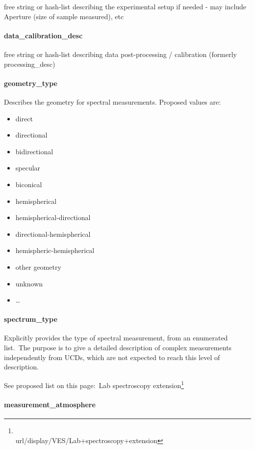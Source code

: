 \documentclass[11pt,a4paper]{ivoa}
\begin{document}
free string or hash-list describing the experimental setup if needed - may include Aperture (size of sample measured), etc

\paragraph{data\_calibration\_desc}

free string or hash-list describing data post-processing / calibration (formerly processing\_desc)

\paragraph{geometry\_type}

Describes the geometry for spectral measurements. Proposed values are:

\begin{itemize}
\item direct
\item directional
\item bidirectional
\item specular
\item biconical
\item hemispherical
\item hemispherical-directional
\item directional-hemispherical
\item hemispheric-hemispherical
\item other geometry
\item unknown
\item …
\end{itemize}

\paragraph{spectrum\_type}

Explicitly provides the type of spectral measurement, from an enumerated list. The purpose is to give a detailed description of complex measurements independently from UCDs, which are not expected to reach this level of description.

See proposed list on this page: Lab spectroscopy extension\footnote{\\url{/display/VES/Lab+spectroscopy+extension}}

\paragraph{measurement\_atmosphere}
\end{document}
